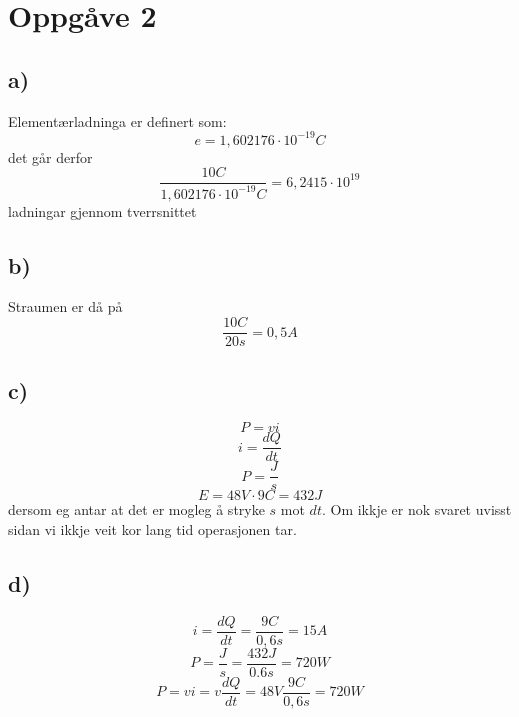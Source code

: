 \documentclass[12pt,a4paper]{article}
\begin{document}
	\section{Oppgåve 2}
		\subsection{a)}
		Elementærladninga er definert som: 
		\begin{equation}
			e = 1,602176\cdot10^{-19}C
		\end{equation}
		det går derfor
		\begin{equation}
			\frac{10C}{1,602176\cdot10^{-19}C}=6,2415\cdot10^{19}
		\end{equation}
		ladningar gjennom tverrsnittet

		\subsection{b)}
		Straumen er då på
		\begin{equation}
			\frac{10C}{20s}=0,5A
		\end{equation}

		\subsection{c)}
		\begin{equation}
			P = vi
		\end{equation}
		\begin{equation}
			i = \frac{dQ}{dt}
		\end{equation}
		\begin{equation}
			P = \frac{J}{s}
		\end{equation}
		\begin{equation}
			E = 48V\cdot9C=432J
		\end{equation}
		dersom eg antar at det er mogleg å stryke $s$ mot $dt$. Om ikkje er nok svaret
		uvisst sidan vi ikkje veit kor lang tid operasjonen tar.

		\subsection{d)}
		\begin{equation}
			i = \frac{dQ}{dt} = \frac{9C}{0,6s}=15A
		\end{equation}
		\begin{equation}
			P = \frac{J}{s} = \frac{432J}{0.6s}=720W
		\end{equation}
		\begin{equation}
			P= vi = v\frac{dQ}{dt} = 48V\frac{9C}{0,6s}=720W
		\end{equation}
\end{document}
